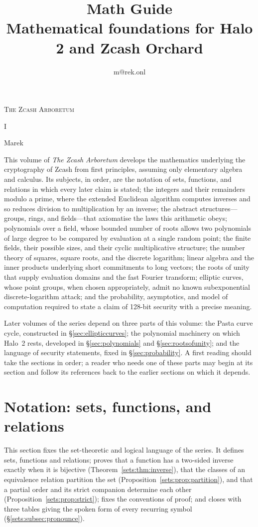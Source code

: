\documentclass[11pt,a4paper]{article}
\title{\textbf{\Huge Math Guide}\\[6pt]\large Mathematical foundations for Halo 2 and Zcash Orchard}
\author{m@rek.onl}
\date{}
\makeatletter
\theoremstyle{definition}
\let\arb@tableofcontents\tableofcontents
\renewcommand{\tableofcontents}{{\hypersetup{pdfborderstyle={/S/U/W 0}}%
  \arb@tableofcontents}}
\providecommand{\accession}{}
\def\arb@name#1#2\@nil{\def\arbvolname{#2}}
\def\arb@parsetitle\textbf#1\\[#2]#3#4\@nil{\arb@name#1\@nil\def\arb@sub{#4}}
\providecommand{\arbvolname}{}
\renewcommand{\maketitle}{\expandafter\arb@parsetitle\@title\@nil
  \hypersetup{pdftitle={\arbvolname: \arb@sub},pdfauthor={Marek}}%
  \thispagestyle{empty}\begingroup\raggedright
  {\fontsize{13.2}{16}\selectfont\scshape The Zcash Arboretum\par}
  \vspace*{50mm}
  {\fontsize{47.3}{50}\selectfont\accession\par}
  \vspace{6mm}
  {\fontsize{22.8}{27}\selectfont\arbvolname\par}
  \vspace{3mm}
  {\fontsize{13.2}{17}\selectfont\arb@sub\par}
  \vspace{18mm}
  {\fontsize{13.2}{17}\selectfont Marek\par}
  {\small\@author\par}
  \endgroup\clearpage}
\theoremstyle{remark}
\renewenvironment{abstract}{%
  \small\begin{center}{\bfseries\abstractname}\end{center}\medskip\noindent\ignorespaces
}{\par\medskip}
\renewcommand{\accession}{I}
\makeatother
\begin{document}
\maketitle
\begin{abstract}
This volume of \emph{The Zcash Arboretum} develops the mathematics
underlying the cryptography of Zcash from first principles, assuming only
elementary algebra and calculus. Its subjects, in order, are the
notation of sets, functions, and relations in which every later claim is
stated; the integers and their remainders modulo a prime, where the extended
Euclidean algorithm computes inverses and so reduces division to
multiplication by an inverse; the abstract structures---groups, rings, and
fields---that axiomatise the laws this arithmetic obeys; polynomials over a
field, whose bounded number of roots allows two polynomials of large degree
to be compared by evaluation at a single random point; the finite fields,
their possible sizes, and their cyclic multiplicative structure; the number
theory of squares, square roots, and the discrete logarithm; linear algebra
and the inner products underlying short commitments to long vectors; the
roots of unity that supply evaluation domains and the fast Fourier
transform; elliptic curves, whose point groups, when chosen appropriately,
admit no known subexponential discrete-logarithm attack; and the
probability, asymptotics, and model of computation required to state a
claim of 128-bit security with a precise meaning.

Later volumes of the series depend on three parts of this volume: the Pasta
curve cycle, constructed in \S\ref{sec:ellipticcurves}; the polynomial
machinery on which Halo~2 rests, developed in \S\ref{sec:polynomials} and
\S\ref{sec:rootsofunity}; and the language of security statements, fixed in
\S\ref{sec:probability}. A first reading should take the sections in order;
a reader who needs one of these parts may begin at its section and follow
its references back to the earlier sections on which it depends.
\end{abstract}

\clearpage
\tableofcontents
\clearpage

\section{Notation: sets, functions, and relations}\label{sec:sets}

This section fixes the set-theoretic and logical language of the series. It
defines sets, functions and relations; proves that a function has a two-sided
inverse exactly when it is bijective (Theorem~\ref{sets:thm:inverse}), that
the classes of an equivalence relation partition the set
(Proposition~\ref{sets:prop:partition}), and that a partial order and its
strict companion determine each other (Proposition~\ref{sets:prop:strict});
fixes the conventions of proof; and closes with three tables giving the
spoken form of every recurring symbol (\S\ref{sets:subsec:pronounce}).
\end{document}
